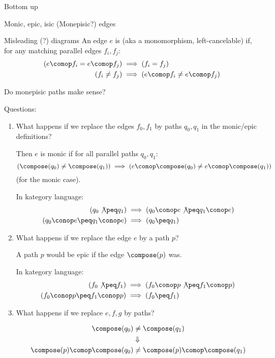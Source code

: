 \begin{plSection}{Bottom up}
\begin{plSection}{Monic, epic, isic (Monepisic?) edges}
\begin{plSection}{Misleading (?) diagrams}
An edge $e$ is  (aka a monomorphism, left-cancelable)
if, for any matching parallel edges $f_i,f_j$:
\begin{align*}
\left( e \comop f_i = e \comop f_j \right) 
& 
\implies 
\left( f_i = f_j \right) 
\\
\left( f_i \neq f_j \right) 
&
\implies 
\left( e \comop f_i \neq e \comop f_j \right) 
\end{align*}
\end{plSection}

\begin{plSection}{Do monepisic paths make sense?}

Questions:
\begin{enumerate}
  \item What happens if we replace the edges $f_0,f_1$
  by paths $q_0,q_1$ in the monic/epic definitions?
  
  Then $e$ is monic if for all parallel paths $q_0,q_1$:
  \[
  \left( \compose(q_0) \neq \compose(q_1) \right) 
  \implies 
  \left( e \comop \compose(q_0) \neq e \comop \compose(q_1) \right)
  \]
  (for the monic case).
  
  In kategory language:
  \begin{align*}
  \left( q_0 \not\peq q_1 \right) 
  & \implies 
  \left( q_0 \conop e \not\peq q_1 \conop e \right)
  \\
  \left( q_0 \conop e \peq q_1 \conop e \right)
  & \implies 
  \left( q_0 \peq q_1 \right) 
  \end{align*}

  \item What happens if we replace the edge $e$ by a path $p$?
  
  A path $p$ would be epic if the edge $\compose(p)$ was.
  
  In kategory language:
  \begin{align*}
  \left( f_0 \not\peq f_1 \right) 
  & \implies 
  \left( f_0 \conop p \not\peq f_1 \conop p \right)
  \\
  \left( f_0 \conop p \peq f_1 \conop p \right)
  & \implies 
  \left( f_0 \peq f_1 \right) 
  \end{align*}
  
  \item What happens if we replace $e,f,g$ by paths?
  
  \begin{align*}
  \compose(q_0) & \neq \compose(q_1) \\
  & \Downarrow \\
  \compose(p) \comop \compose(q_0) 
  & \neq \compose(p) \comop \compose(q_1) 
  \end{align*}
  

\end{enumerate}
\end{plSection}
\end{plSection}
\end{plSection}

